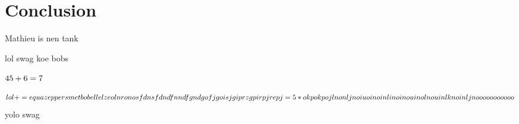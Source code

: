\documentclass{article}
\begin{document}
\section{Conclusion}
Mathieu is nen tank
\newpage

lol
swag
koe
\newline
bobs

$45 + 6 =  \newline 7$

\begin{equation}
lol += equa \newline
zeppers met bobellel zeoln ron osfdn sfdn dfn ndf gnd gofjgoisjgiprz gpir pjrep j = \hbox{} 5 *okpokpojlnonljnoiuoinoinlinoinouinolnouinlknoinljnooooooooooo
\end{equation}
yolo
\hbox{\hbox{}}
\hbox{\newline \newline }
swag
%
%
\end{document}
